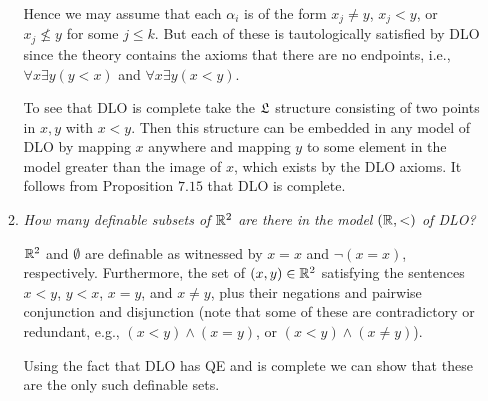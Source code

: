 \documentclass[10pt]{article}
\begin{document}
\begin{enumerate}
\begin{enumerate}
Hence we may assume that each $\alpha_i$ is of the form $x_j \neq y$, $x_j < y$, or $x_j \not\le y$ for some $j \leq k$.  But each of these is tautologically satisfied by DLO since the theory contains the axioms that there are no endpoints, i.e., $\forall x \exists y (y < x)$ and $\forall x \exists y(x<y)$.

To see that DLO is complete take the $\mathfrak{L}$ structure consisting of two points in $x,y$ with $x < y$.  Then this structure can be embedded in any model of DLO by mapping $x$ anywhere and mapping $y$ to some element in the model greater than the image of $x$, which exists by the DLO axioms.  It follows from Proposition $7.15$ that DLO is complete.

\item \emph{How many definable subsets of $\mathbb{R}^2$ are there in the model $(\mathbb{R}, <)$ of DLO?}

$\mathbb{R}^2$ and $\emptyset$ are definable as witnessed by $x=x$ and $\neg(x=x)$, respectively.  Furthermore, the set of $(x,y) \in \mathbb{R}^2$ satisfying the sentences $x < y$, $y < x$, $x = y$, and $x \neq y$, plus their negations and pairwise conjunction and disjunction (note that some of these are contradictory or redundant, e.g., $(x < y) \land (x = y)$, or $(x < y) \land (x \neq y)$).

Using the fact that DLO has QE and is complete we can show that these are the only such definable sets.
\end{enumerate}

\end{enumerate}
\end{document}
